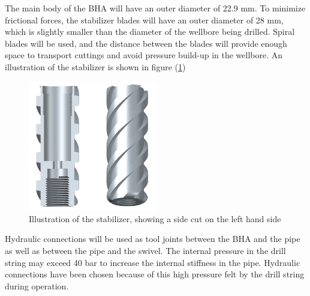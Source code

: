 The main body of the BHA will have an outer diameter of 22.9 mm. To minimize frictional forces, the stabilizer blades will have an outer diameter of 28 mm, which is slightly smaller than the diameter of the wellbore being drilled. Spiral blades will be used, and the distance between the blades will provide enough space to transport cuttings and avoid pressure build-up in the wellbore. An illustration of the stabilizer is shown in figure (\ref{fig:stabilizer})

\begin{figure} [H]
\centering
\includegraphics[width=0.5\textwidth]{figures/Stabilizer.jpeg}
\caption{Illustration of the stabilizer, showing a side cut on the left hand side}
\label{fig:stabilizer}
\end{figure}



Hydraulic connections will be used as tool joints between the BHA and the pipe as well as between the pipe and the swivel. The internal pressure in the drill string may exceed 40 bar to increase the internal stiffness in the pipe. Hydraulic connections have been chosen because of this high pressure felt by the drill string during operation. 